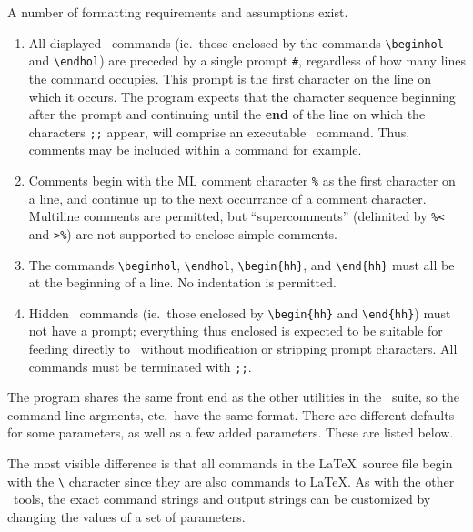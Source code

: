 A number of formatting requirements and assumptions exist.  
\begin{enumerate}
\item All displayed \HOL\ commands (ie.~those enclosed by the commands\linebreak
\verb+\beginhol+ and \verb+\endhol+) are preceded by a single prompt \verb+#+,
regardless of how many lines the command occupies.  This prompt is the
first character on the line on which it occurs.  The program expects
that the character sequence beginning after the prompt and continuing
until the {\bf end} of the line on which the characters \verb+;;+
appear, will comprise an executable \HOL\ command.  Thus, comments may
be included within a command for example.
\item Comments begin with the ML comment character \verb+%+ as the
first character on a line, and continue up to the next occurrance of a
comment character.  Multiline comments are permitted, but
``supercomments'' (delimited by \verb+%<+ and \verb+>%+) are not
supported to enclose simple comments. 
\item The commands \verb+\beginhol+, \verb+\endhol+, \verb+\begin{hh}+,
and \verb+\end{hh}+ must all be at the beginning of a line.  No
indentation is permitted.
\item Hidden \HOL\ commands (ie.~those enclosed by \verb+\begin{hh}+
and \verb+\end{hh}+) must not have a prompt; everything thus enclosed
is expected to be suitable for feeding directly to \HOL\ without
modification or stripping prompt characters.  All commands must be
terminated with \verb+;;+.
\end{enumerate}

The program shares the same front end as the other utilities in the
\mweb\ suite, so the command line argments, etc.\ have the same
format.  There are different defaults for some parameters, as well as
a few added parameters.  These are listed below.

The most visible difference is that all commands in the \LaTeX\ source
file begin with the \verb+\+ character since they are also commands to
\LaTeX.  As with the other \mweb\ tools, the exact command strings and
output strings can be customized by changing the values of a set of
parameters. 

\noindent\cmdrule

